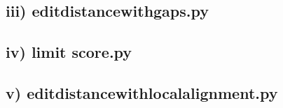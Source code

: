 \documentclass[10pt]{article}
\begin{document}
\subsection*{iii) edit\textunderscore distance\textunderscore with\textunderscore gaps.py}

\newpage
\subsection*{iv) limit \textunderscore score.py}

\bigskip\bigskip
\subsection*{v) edit\textunderscore distance\textunderscore with\textunderscore local\textunderscore alignment.py}

\end{document}
